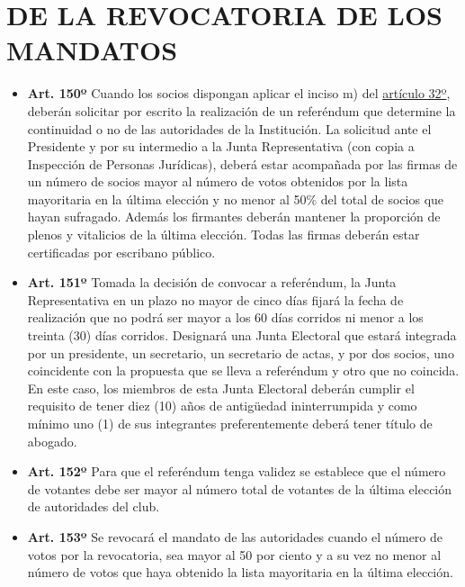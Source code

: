 \documentclass[openany]{book}
\providecommand{\tightlist}{%
  \setlength{\itemsep}{0pt}\setlength{\parskip}{0pt}}
\begin{document}
\hypertarget{cap25}{%
\chapter{DE LA REVOCATORIA DE LOS MANDATOS}\label{cap25}}

\begin{itemize}
\tightlist
\item
  \textbf{Art. 150º}
  Cuando los socios dispongan aplicar el inciso m) del \protect\hyperlink{art32}{artículo 32º}, deberán solicitar por escrito la realización de un referéndum que determine la continuidad o no de las autoridades de la Institución. La solicitud ante el Presidente y por su intermedio a la Junta Representativa (con copia a Inspección de Personas Jurídicas), deberá estar acompañada por las firmas de un número de socios mayor al número de votos obtenidos por la lista mayoritaria en la última elección y no menor al 50\% del total de socios que hayan sufragado. Además los firmantes deberán mantener la proporción de plenos y vitalicios de la última elección. Todas las firmas deberán estar certificadas por escribano público.
\end{itemize}

\begin{itemize}
\tightlist
\item
  \textbf{Art. 151º}
  Tomada la decisión de convocar a referéndum, la Junta Representativa en un plazo no mayor de cinco días fijará la fecha de realización que no podrá ser mayor a los 60 días corridos ni menor a los treinta (30) días corridos. Designará una Junta Electoral que estará integrada por un presidente, un secretario, un secretario de actas, y por dos socios, uno coincidente con la propuesta que se lleva a referéndum y otro que no coincida. En este caso, los miembros de esta Junta Electoral deberán cumplir el requisito de tener diez (10) años de antigüedad ininterrumpida y como mínimo uno (1) de sus integrantes preferentemente deberá tener título de abogado.
\end{itemize}

\begin{itemize}
\tightlist
\item
  \textbf{Art. 152º}
  Para que el referéndum tenga validez se establece que el número de votantes debe ser mayor al número total de votantes de la última elección de autoridades del club.
\end{itemize}

\begin{itemize}
\tightlist
\item
  \textbf{Art. 153º}
  Se revocará el mandato de las autoridades cuando el número de votos por la revocatoria, sea mayor al 50 por ciento y a su vez no menor al número de votos que haya obtenido la lista mayoritaria en la última elección.
\end{itemize}
\end{document}
